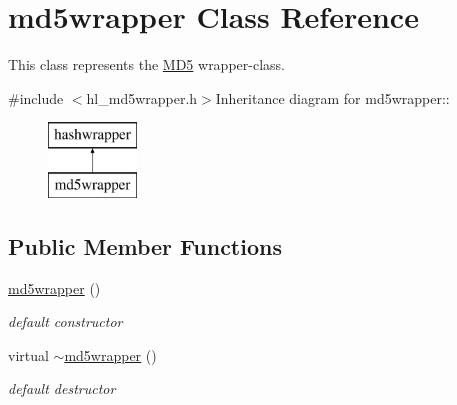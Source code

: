 \hypertarget{classmd5wrapper}{
\section{md5wrapper Class Reference}
\label{classmd5wrapper}
}


This class represents the \hyperlink{class_m_d5}{MD5} wrapper-\/class.  


{\ttfamily \#include $<$hl\_\-md5wrapper.h$>$}Inheritance diagram for md5wrapper::\begin{figure}[H]
\begin{center}
\leavevmode
\includegraphics[height=2cm]{classmd5wrapper}
\end{center}
\end{figure}
\subsection*{Public Member Functions}
\begin{DoxyCompactItemize}
\item 
\hyperlink{classmd5wrapper_aae8138b76b89d93a4c21077b76d57c07}{md5wrapper} ()
\begin{DoxyCompactList}\small\item\em default constructor \item\end{DoxyCompactList}\item 
virtual \hyperlink{classmd5wrapper_a65e78258ad508d83be81d395f8bd43f4}{$\sim$md5wrapper} ()
\begin{DoxyCompactList}\small\item\em default destructor \item\end{DoxyCompactList}\end{DoxyCompactItemize}
